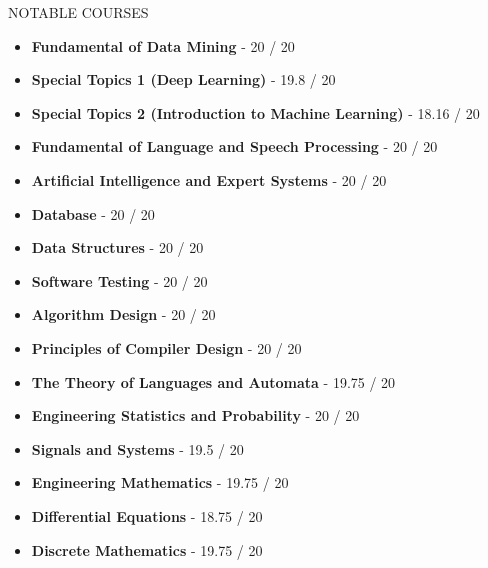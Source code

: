 \documentclass[]{CV}
\begin{document}
\vspace{-2mm}
\begin{section}{NOTABLE COURSES}
\begin{multicols}{2}
    \begin{itemize}
	\item \textbf{Fundamental of Data Mining} - 20 / 20
	\item \textbf{Special Topics 1 (Deep Learning)} - 19.8 / 20
	\item \textbf{Special Topics 2 (Introduction to Machine Learning)} - 18.16 / 20
	\item \textbf{Fundamental of Language and Speech Processing} - 20 / 20
	\item \textbf{Artificial Intelligence and Expert Systems} - 20 / 20
	
	\item \textbf{Database} - 20 / 20
	\item \textbf{Data Structures} - 20 / 20
	\item \textbf{Software Testing} - 20 / 20
	\item \textbf{Algorithm Design} - 20 / 20
	\item \textbf{Principles of Compiler Design} - 20 / 20
	\item \textbf{The Theory of Languages ​​and Automata} - 19.75 / 20
	
	\item \textbf{Engineering Statistics and Probability} - 20 / 20
	\item \textbf{Signals and Systems} - 19.5 / 20
	\item \textbf{Engineering Mathematics} - 19.75 / 20
	\item \textbf{Differential Equations} - 18.75 / 20
	\item \textbf{Discrete Mathematics} - 19.75 / 20
	
    \end{itemize}
    \end{multicols}
\end{section}
\end{document}
